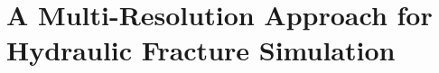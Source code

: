 \chapter[A Multi-Resolution Approach for Hydraulic Fracture Simulation]{A Multi-Resolution Approach for Hydraulic Fracture Simulation\footnotemark}

\label{section: Chapter3}










